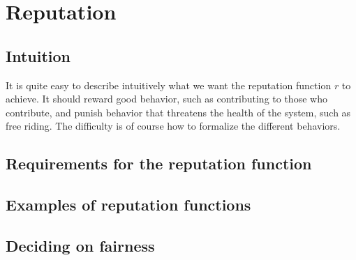 \chapter{Reputation}\label{chapter:reputation}
\section{Intuition}
It is quite easy to describe intuitively what we want the reputation function $r$ to achieve. 
It should reward good behavior, 
such as contributing to those who contribute, 
and punish behavior that threatens the health of the system, 
such as free riding. 
The difficulty is of course how to formalize the different behaviors.

\section{Requirements for the reputation function}\label{section:requirements_reputation}

\section{Examples of reputation functions}\label{section:examples_reputation_functions}

\section{Deciding on fairness}
